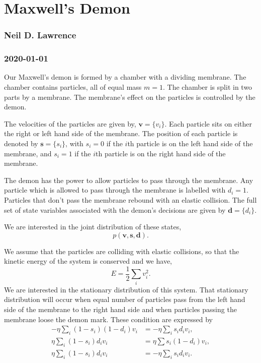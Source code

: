 \documentclass[
]{article}
\author{}
\date{}
\begin{document}
\hypertarget{maxwells-demon}{%
\section{Maxwell's Demon}\label{maxwells-demon}}

\hypertarget{neil-d-lawrence}{%
\subsubsection{Neil D. Lawrence}\label{neil-d-lawrence}}

\hypertarget{2020-01-01}{%
\subsubsection{2020-01-01}\label{2020-01-01}}

Our Maxwell's demon is formed by a chamber with a dividing membrane. The
chamber contains particles, all of equal mass \(m=1\). The chamber is
split in two parts by a membrane. The membrane's effect on the particles
is controlled by the demon.

The velocities of the particles are given by, \(\mathbf{v} = \{ v_i\}\).
Each particle sits on either the right or left hand side of the
membrane. The position of each particle is denoted by
\(\mathbf{s} = \{ s_i \}\), with \(s_i=0\) if the \(i\)th particle is on
the left hand side of the membrane, and \(s_i = 1\) if the \(i\)th
particle is on the right hand side of the membrane.

The demon has the power to allow particles to pass through the membrane.
Any particle which is allowed to pass through the membrane is labelled
with \(d_i = 1\). Particles that don't pass the membrane rebound with an
elastic collision. The full set of state variables associated with the
demon's decisions are given by \(\mathbf{d} = \{ d_i \}\).

We are interested in the joint distribution of these states, \[
p(\mathbf{v}, \mathbf{s}, \mathbf{d}).
\]

We assume that the particles are colliding with elastic collisions, so
that the kinetic energy of the system is conserved and we have, \[
E = \frac{1}{2}\sum_{i}v_i^2.
\] We are interested in the stationary distribution of this system.
That stationary distribution will occur when equal number of particles
pass from the left hand side of the membrane to the right hand side and
when particles passing the membrane loose the demon mark. These
condition are expressed by \[\begin{align*}
-\eta\sum_{i} (1-s_i)(1-d_i) v_i & = -\eta\sum_{i} s_i d_i v_i,\\
\eta\sum_{i} (1-s_i) d_i v_i & = \eta\sum s_i(1- d_i) v_i,\\
\eta\sum_{i} (1-s_i) d_i v_i & = -\eta\sum_{i} s_i d_i v_i.
\end{align*}\]
\end{document}

